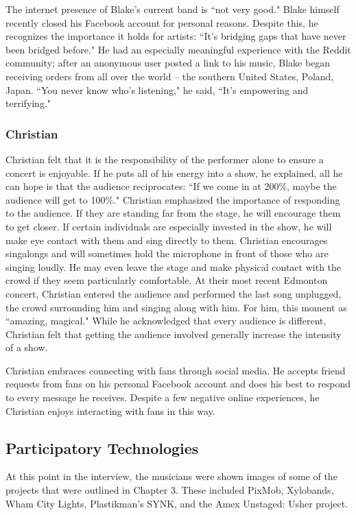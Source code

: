 The internet presence of Blake's current band is ``not very good." Blake himself recently closed his Facebook account for personal reasons. Despite this, he recognizes the importance it holds for artists: ``It's bridging gaps that have never been bridged before." He had an especially meaningful experience with the Reddit community; after an anonymous user posted a link to his music, Blake began receiving orders from all over the world -- the southern United States, Poland, Japan. ``You never know who's listening," he said, ``It's empowering and terrifying."

\subsubsection{Christian}
Christian felt that it is the responsibility of the performer alone to ensure a concert is enjoyable. If he puts all of his energy into a show, he explained, all he can hope is that the audience reciprocates: ``If we come in at 200\%, maybe the audience will get to 100\%." Christian emphasized the importance of responding to the audience. If they are standing far from the stage, he will encourage them to get closer. If certain individuals are especially invested in the show, he will make eye contact with them and sing directly to them. Christian encourages singalongs and will sometimes hold the microphone in front of those who are singing loudly. He may even leave the stage and make physical contact with the crowd if they seem particularly comfortable. At their most recent Edmonton concert, Christian entered the audience and performed the last song unplugged, the crowd surrounding him and singing along with him. For him, this moment as ``amazing, magical." While he acknowledged that every audience is different, Christian felt that getting the audience involved generally increase the intensity of a show.

Christian embraces connecting with fans through social media. He accepts friend requests from fans on his personal Facebook account and does his best to respond to every message he receives. Despite a few negative online experiences, he Christian enjoys interacting with fans in this way.

\subsection{Participatory Technologies}

At this point in the interview, the musicians were shown images of some of the projects that were outlined in Chapter 3. These included PixMob, Xylobands, Wham City Lights, Plastikman's SYNK, and the Amex Unstaged: Usher project.

